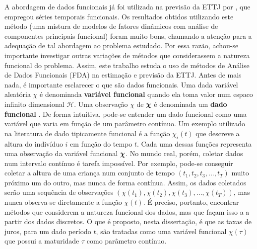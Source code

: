 \documentclass[
	12pt,				%
	openright,			%
	oneside,			%
	a4paper,			%
	english,			%
	brazil				%
	]{dissertacao-ufrgs-abntex2}
\begin{document}
A abordagem de dados funcionais já foi utilizada na previsão da ETTJ por , que empregou séries temporais funcionais. Os resultados obtidos utilizando este método (uma mistura de modelos de fatores dinâmicos com análise de componentes principais funcional) foram muito bons, chamando a atenção para a adequação de tal abordagem ao problema estudado. Por essa razão, achou-se importante investigar outras variações de métodos que considerassem a natureza funcional do problema. 
Assim, este trabalho estuda o uso de métodos de Análise de Dados Funcionais (FDA) na estimação e previsão da ETTJ. Antes de mais nada, é importante esclarecer o que são dados funcionais.
Uma dada variável aleatória $\chi$ é denominada \textbf{variável
funcional }quando ela toma valor num espaco infinito dimensional $\mathcal{H}$.
Uma observação $\chi$ de $\mathcal{\boldsymbol{\chi}}$ é denominada um \textbf{dado
funcional} \cite{vieu_nonparametric_2006}.
De forma intuitiva, pode-se entender um dado funcional como uma variável
que varia em função de um parâmetro contínuo. Um exemplo utilizado
na literatura de dado tipicamente funcional é a função $\chi_{i}(t)$
que descreve a altura do indivíduo $i$ em função do tempo $t$. Cada
uma dessas funções representa uma observação da variável funcional
$\boldsymbol{\chi}$. 
No mundo real, porém, coletar dados num intervalo contínuo é tarefa
impossível. Por exemplo, pode-se conseguir coletar a altura de uma
criança num conjunto de tempo $(t_{1},t_{2},t_{3},...,t_{T})$ muito
próximo um do outro, mas nunca de forma contínua. Assim, os dados coletados serão 
uma sequência de observações $(\chi(t_{1}),\chi(t_{2}),\chi(t_{3}),...,\chi(t_{T}))$,
mas nunca observa-se diretamente a função $\chi(t)$. É preciso, portanto, encontrar
métodos que considerem a natureza funcional dos dados, mas que façam isso a a partir dos dados discretos.
O que é proposto, nesta dissertação, é que as taxas de juros, para um dado período $t$, são tratadas como uma variável funcional $\chi(\tau)$ que possui a maturidade $\tau$ como parâmetro contínuo.
\end{document}
